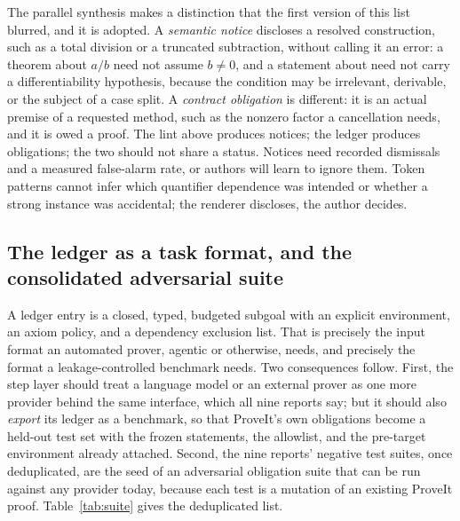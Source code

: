 \documentclass[11pt,a4paper]{article}
\newcommand{\code}[1]{\texttt{\detokenize{#1}}}
\theoremstyle{definition}
\begin{document}
The parallel synthesis makes a distinction that the first version of this list blurred, and it is adopted. A \emph{semantic notice} discloses a resolved construction, such as a total division or a truncated subtraction, without calling it an error: a theorem about $a/b$ need not assume $b\neq 0$, and a statement about \code{deriv} need not carry a differentiability hypothesis, because the condition may be irrelevant, derivable, or the subject of a case split. A \emph{contract obligation} is different: it is an actual premise of a requested method, such as the nonzero factor a cancellation needs, and it is owed a proof. The lint above produces notices; the ledger produces obligations; the two should not share a status. Notices need recorded dismissals and a measured false-alarm rate, or authors will learn to ignore them. Token patterns cannot infer which quantifier dependence was intended or whether a strong instance was accidental; the renderer discloses, the author decides.

\subsection{The ledger as a task format, and the consolidated adversarial suite}
\label{sec:suite}
A ledger entry is a closed, typed, budgeted subgoal with an explicit environment, an axiom policy, and a dependency exclusion list. That is precisely the input format an automated prover, agentic or otherwise, needs, and precisely the format a leakage-controlled benchmark needs. Two consequences follow. First, the step layer should treat a language model or an external prover as one more provider behind the same interface, which all nine reports say; but it should also \emph{export} its ledger as a benchmark, so that ProveIt's own obligations become a held-out test set with the frozen statements, the allowlist, and the pre-target environment already attached. Second, the nine reports' negative test suites, once deduplicated, are the seed of an adversarial obligation suite that can be run against any provider today, because each test is a mutation of an existing ProveIt proof. Table~\ref{tab:suite} gives the deduplicated list.
\end{document}
